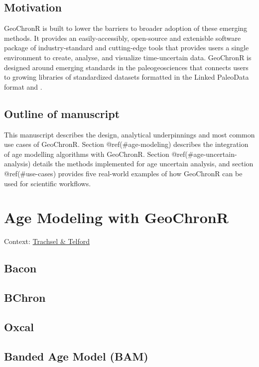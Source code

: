 \documentclass[gc, manuscript]{copernicus}
\begin{document}
\subsection{Motivation}

GeoChronR is built to lower the barriers to broader adoption of these
emerging methods. It provides an easily-accessibly, open-source and
extenisble software package of industry-standard and cutting-edge tools
that provides users a single environment to create, analyse, and
visualize time-uncertain data. GeoChronR is designed around emerging
standards in the paleogeosciences that connects users to growing
libraries of standardized datasets formatted in the Linked PaleoData
format \citep{LiPD} and \citep{neotoma}.

\subsection{Outline of manuscript}

This manuscript describes the design, analytical underpinnings and most
common use cases of GeoChronR. Section @ref(\#age-modeling) describes
the integration of age modelling algorithms with GeoChronR. Section
@ref(\#age-uncertain-analysis) details the methods implemented for age
uncertain analysis, and section @ref(\#use-cases) provides five
real-world examples of how GeoChronR can be used for scientific
workflows.

\hypertarget{age-modeling}{%
\section{Age Modeling with GeoChronR}\label{age-modeling}}

Context: \href{https://doi.org/10.1177/0959683616675939}{Trachsel \&
Telford}

\subsection{Bacon}

\subsection{BChron}

\subsection{Oxcal}

\subsection{Banded Age Model (BAM)}
\end{document}
